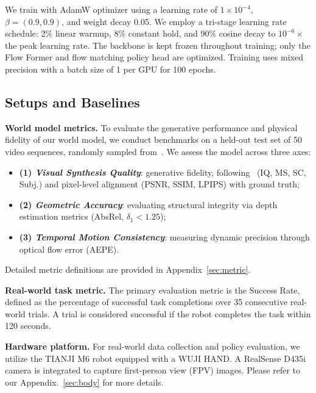 We train with AdamW optimizer using a learning rate of $1 \times 10^{-4}$, $\beta = (0.9, 0.9)$, and weight decay 0.05. We employ a tri-stage learning rate schedule: 2\% linear warmup, 8\% constant hold, and 90\% cosine decay to $10^{-6}\times$ the peak learning rate. The \our backbone is kept frozen throughout training; only the Flow Former and flow matching policy head are optimized. Training uses mixed precision with a batch size of 1 per GPU for 100 epochs. 


\subsection{Setups and Baselines}
\noindent 
\textbf{World model metrics.}
To evaluate the generative performance and physical fidelity of our world model, we conduct benchmarks on a held-out test set of 50 video sequences, randomly sampled from~\citep{wu2024robomind,liu2024rdt,jiang2025galaxea}. We assess the model across three axes: 
\begin{itemize}[labelsep=0.6em, leftmargin=1.2em,itemindent=0em]
    \item \textbf{(1) \textit{Visual Synthesis Quality}}: generative fidelity, following~\citep{zhou2025pai} (IQ, MS, SC, Subj.) and pixel-level alignment (PSNR, SSIM, LPIPS) with ground truth;
    
    \item \textbf{(2) \textit{Geometric Accuracy}}: evaluating structural integrity via depth estimation metrics (AbsRel, $\delta_1 < 1.25$); 
    
    \item \textbf{(3) \textit{Temporal Motion Consistency}}: measuring dynamic precision through optical flow error (AEPE). 
\end{itemize}
Detailed metric definitions are provided in Appendix~\ref{sec:metric}.




\noindent 
\textbf{Real-world task metric.} 
The primary evaluation metric is the Success Rate, defined as the percentage of successful task completions over 35 consecutive real-world trials. A trial is considered successful if the robot completes the task within 120 seconds.




\noindent 
\textbf{Hardware platform.} 
For real-world data collection and policy evaluation, we utilize the TIANJI M6 robot equipped with a WUJI HAND. A RealSense D435i camera is integrated to capture first-person view (FPV) images. Please refer to our Appendix.~\ref{sec:body} for more details.

